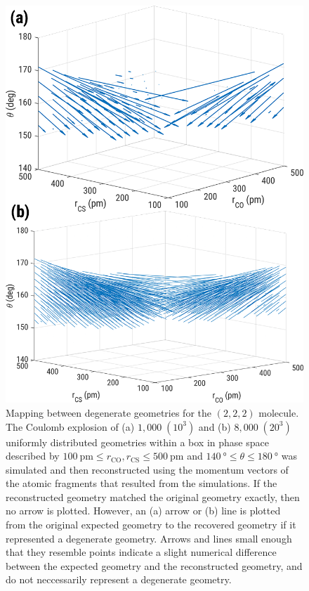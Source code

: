 \begin{figure}
  \centering
  \includegraphics[width=\textwidth]{Plots/OCS222DegeneracyMap}
  \caption[Mapping between degenerate geometries for the  $(2,2,2)$ molecule.]
  {Mapping between degenerate geometries for the  $(2,2,2)$ molecule. The Coulomb explosion of (a) $1,000 \; (10^3)$ and (b) $8,000 \; (20^3)$ uniformly distributed geometries within a box in phase space described by $\SI{100}{\pico\meter} \le r_\mathrm{CO}, r_\mathrm{CS} \le \SI{500}{\pico\meter}$ and $\SI{140}{\degree} \le \theta \le \SI{180}{\degree}$ was simulated and then reconstructed using the momentum vectors of the atomic fragments that resulted from the simulations. If the reconstructed geometry matched the original geometry exactly, then no arrow is plotted. However, an (a) arrow or (b) line is plotted from the original expected geometry to the recovered geometry if it represented a degenerate geometry. Arrows and lines small enough that they resemble points indicate a slight numerical difference between the expected geometry and the reconstructed geometry, and do not neccessarily represent a degenerate geometry.}
  \label{fig:OCS222DegeneracyMaps}
\end{figure}

